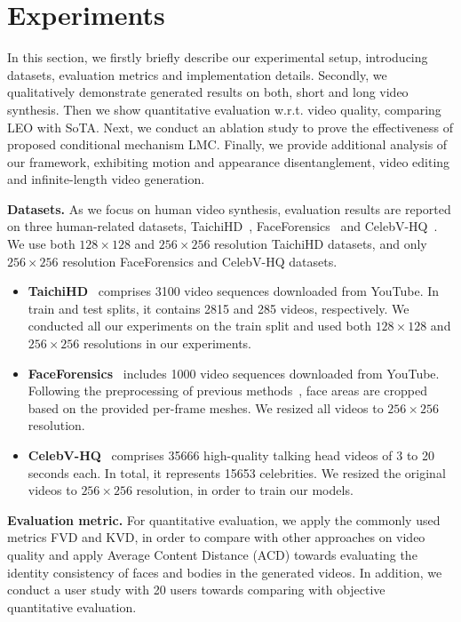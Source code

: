 {\section{Experiments}
In this section, we firstly briefly describe our experimental setup, introducing datasets, evaluation metrics and implementation details. Secondly, we qualitatively demonstrate generated results on both, short and long video synthesis. Then we show quantitative evaluation w.r.t. video quality, comparing LEO with SoTA. Next, we conduct an ablation study to prove the effectiveness of proposed conditional mechanism LMC. Finally, we provide additional analysis of our framework, exhibiting motion and appearance disentanglement, video editing and infinite-length video generation. 

\textbf{Datasets.} As we focus on human video synthesis, evaluation results are reported on three human-related datasets, TaichiHD~\cite{fomm}, FaceForensics~\cite{rossler2018faceforensics} and CelebV-HQ~\cite{zhu2022celebvhq}. We 
use both $128\times 128$ and $256\times 256$ resolution TaichiHD datasets, and only $256\times 256$ resolution FaceForensics and CelebV-HQ datasets.

\begin{itemize}
    \item \textbf{TaichiHD}~\cite{fomm} comprises 3100 video sequences downloaded from YouTube. In train and test splits, it contains 2815 and 285 videos, respectively. We conducted all our experiments on the train split and used both $128\times 128$ and $256\times 256$ resolutions in our experiments.
    \item \textbf{FaceForensics}~\cite{rossler2018faceforensics} includes 1000 video sequences downloaded from YouTube. Following the preprocessing of previous methods~\citep{TGAN2020, stylegan-v}, face areas are cropped based on the provided per-frame meshes. We resized all videos to $256\times 256$ resolution.
    \item \textbf{CelebV-HQ}~\cite{zhu2022celebvhq} comprises 35666 high-quality talking head videos of 3 to 20 seconds each. In total, it represents 15653 celebrities. We resized the original videos to $256\times 256$ resolution, in order to train our models. 
\end{itemize}

\textbf{Evaluation metric.} For quantitative evaluation, we apply the commonly used metrics FVD and KVD, in order to compare with other approaches on video quality and apply Average Content Distance (ACD) towards evaluating the identity consistency of faces and bodies in the generated videos. In addition, we conduct a user study with 20 users towards comparing with objective quantitative evaluation. 

}
